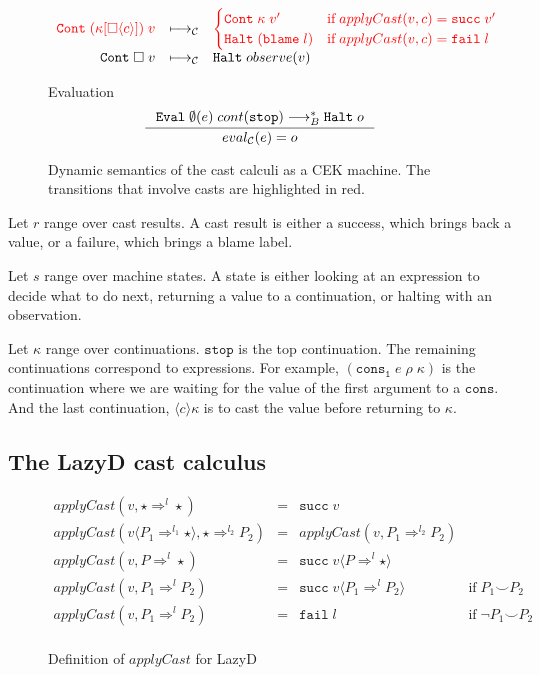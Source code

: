 \documentclass[acmsmall,review,anonymous]{acmart}\settopmatter{printfolios=true,printccs=false,printacmref=false}
\newcommand{\funrule}[3]{#1 &=& #2 & #3\\}
\newcommand{\lazyD}{Lazy\;D}
\newcommand{\sOOinspect}[3]{\mathtt{Eval} \; #2(#1) \; #3}
\newcommand{\sOOreturn}[2]{\mathtt{Cont} \; #2 \; #1}
\newcommand{\sOOhalt}[1]{\mathtt{Halt} \; #1}
\newcommand{\cOOcast}[3]{#1 \Rightarrow^{#2} #3}
\newcommand{\oOOblame}[1]{\mathtt{blame} \; #1}
\newcommand{\vOOcast}[2]{#1\langle#2\rangle}
\newcommand{\rOOsucc}[1]{\mathtt{succ}\;#1}
\newcommand{\rOOfail}[1]{\mathtt{fail}\;#1}
\newcommand{\kOOmt}[0]{\square}
\newcommand{\kOOcast}[2]{
	#2[\square \langle #1 \rangle]}
\newcommand{\hckOOmt}[0]{\mathtt{stop}}
\newcommand{\sidecond}[1]{\text{if}\;#1}
\newcommand{\judgeCeval}[2]{eval_{\mathcal{C}}(#1) = #2}
\newcommand{\redrule}[3]{#1 & \longmapsto_\mathcal{C} & #2 & #3\\}
\newcommand{\highlight}[1]{{\color{red} #1}}
\begin{document}
\begin{figure}
\[\begin{array}{rclr}
	\redrule{
		\highlight{\sOOreturn{v}{(
				\kOOcast{c}{\kappa}
			)}}
	}{
\highlight{          
\begin{cases}
	\sOOreturn{v'}{\kappa} & \sidecond{applyCast(v,c) = \rOOsucc{v'}}
	\\
	\sOOhalt{(\oOOblame{l})} & \sidecond{applyCast(v,c) = \rOOfail{l}}
\end{cases}}
	}{}
\redrule{
\sOOreturn{v}{\kOOmt}}{
\sOOhalt{observe(v)}}{}
	\end{array}
	\]	
	
	Evaluation \fbox{$\judgeCeval{e}{o}$}
	\[
	\inference{
		\sOOinspect{e}{\emptyset}{cont(\hckOOmt)} \longrightarrow_{B}^{*} 
		\sOOhalt{o}
	}{
		\judgeCeval{e}{o}
	}
	\]
	
	\caption{Dynamic semantics of the cast calculi as a CEK
          machine. The transitions that involve casts are highlighted
          in red.}
	\label{fig:machine-cekc}
\end{figure}


Let $ r $ range over cast results. A cast result is either a success, which 
brings back a value, or a failure, which brings a blame label.

Let $ s $ range over machine states. A state is either looking at an 
expression to decide what to do next, returning a value to a continuation, or 
halting with an observation.

Let $ \kappa $ range over continuations. $ \mathtt{stop} $ is the top 
continuation. The remaining continuations correspond to expressions. For 
example, $ (\mathtt{cons_1} \; e \; \rho \; \kappa) $ is the continuation where 
we are waiting for the value of the first argument to a $ \mathtt{cons} $. And 
the last continuation, $ \langle c \rangle \kappa $ is to cast the value before 
returning to $ \kappa $.


\subsection{The \lazyD{} cast calculus}

\begin{figure}
	
	\[
	\begin{array}{rclr}
	\funrule{
		applyCast(v,\cOOcast{\star}{l}{\star})
	}{
		\rOOsucc{v}
	}{}
	\funrule{
		applyCast(\vOOcast{v}{\cOOcast{P_1}{l_1}{\star}},\cOOcast{\star}{l_2}{P_2})
	}{
		applyCast(v,\cOOcast{P_1}{l_2}{P_2})
	}{}
	\funrule{
		applyCast(v,\cOOcast{P}{l}{\star})
	}{
		\rOOsucc{\vOOcast{v}{\cOOcast{P}{l}{\star}}}
	}{}
	\funrule{
		applyCast(v,\cOOcast{P_1}{l}{P_2})
	}{
		\rOOsucc{\vOOcast{v}{\cOOcast{P_1}{l}{P_2}}}
	}{\sidecond{P_1 \smile P_2}}
	\funrule{
		applyCast(v,\cOOcast{P_1}{l}{P_2})
	}{
		\rOOfail{l}
	}{\sidecond{\neg P_1 \smile P_2}}
	
	\end{array}
	\]
	\caption{Definition of $ applyCast $ for \lazyD}
	\label{fig:applyCast-D-C}
\end{figure}
\end{document}
